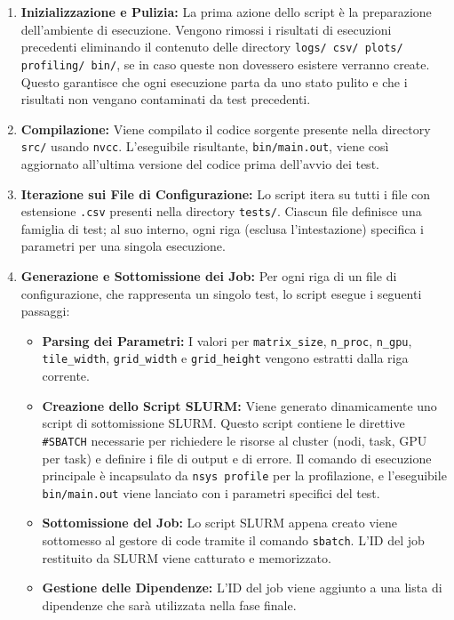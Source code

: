 \documentclass[a4paper]{article}
\begin{document}
\begin{enumerate}
    \item \textbf{Inizializzazione e Pulizia:} La prima azione dello script è la preparazione dell'ambiente di esecuzione. Vengono rimossi i risultati di esecuzioni precedenti eliminando il contenuto delle directory \texttt{logs/ csv/ plots/ profiling/ bin/}, se in caso queste non dovessero esistere verranno create. Questo garantisce che ogni esecuzione parta da uno stato pulito e che i risultati non vengano contaminati da test precedenti.

    \item \textbf{Compilazione:} Viene compilato il codice sorgente presente nella directory \texttt{src/} usando \texttt{nvcc}. L'eseguibile risultante, \texttt{bin/main.out}, viene così aggiornato all'ultima versione del codice prima dell'avvio dei test.

    \item \textbf{Iterazione sui File di Configurazione:} Lo script itera su tutti i file con estensione \texttt{.csv} presenti nella directory \texttt{tests/}. Ciascun file definisce una famiglia di test; al suo interno, ogni riga (esclusa l'intestazione) specifica i parametri per una singola esecuzione.

    \item \textbf{Generazione e Sottomissione dei Job:} Per ogni riga di un file di configurazione, che rappresenta un singolo test, lo script esegue i seguenti passaggi:
          \begin{itemize}
              \item \textbf{Parsing dei Parametri:} I valori per \texttt{matrix\_size}, \texttt{n\_proc}, \texttt{n\_gpu}, \texttt{tile\_width}, \texttt{grid\_width} e \texttt{grid\_height} vengono estratti dalla riga corrente.
              \item \textbf{Creazione dello Script SLURM:} Viene generato dinamicamente uno script di sottomissione SLURM. Questo script contiene le direttive \texttt{\#SBATCH} necessarie per richiedere le risorse al cluster (nodi, task, GPU per task) e definire i file di output e di errore. Il comando di esecuzione principale è incapsulato da \texttt{nsys profile} per la profilazione, e l'eseguibile \texttt{bin/main.out} viene lanciato con i parametri specifici del test.
              \item \textbf{Sottomissione del Job:} Lo script SLURM appena creato viene sottomesso al gestore di code tramite il comando \texttt{sbatch}. L'ID del job restituito da SLURM viene catturato e memorizzato.
              \item \textbf{Gestione delle Dipendenze:} L'ID del job viene aggiunto a una lista di dipendenze che sarà utilizzata nella fase finale.
          \end{itemize}


\end{enumerate}
\end{document}

